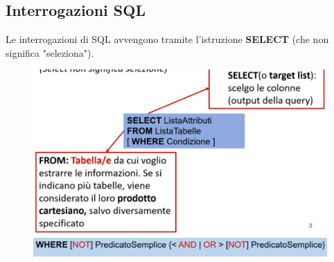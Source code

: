 \documentclass[12pt, a4paper]{article}
\begin{document}
    \subsection{Interrogazioni SQL}
    Le interrogazioni di SQL avvengono tramite l'istruzione \textbf{SELECT} (che non significa "seleziona").
    \begin{figure}[htbp]
        \centering
        \includegraphics[scale=0.5]{select.png}
        \includegraphics[scale=0.5]{where.png}
    \end{figure}
        



    
    
    
\end{document}
